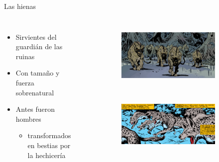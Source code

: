 \begin{frame}{Las hienas}
	\begin{columns}
		\begin{itemize}
			\item Sirvientes del guardián de las ruinas
			\item Con tamaño y fuerza sobrenatural
			\item Antes fueron hombres
			\begin{itemize}
				\item transformados en bestias por la hechicería
			\end{itemize}
		\end{itemize}
		\begin{figure}[htp]
			\centering
			\begin{subfigure}[b]{0.6\textwidth}
				\includegraphics[width=\textwidth]{img/hienas/DH}
			\end{subfigure}
			\\
			\begin{subfigure}[b]{0.6\textwidth}
				\includegraphics[width=\textwidth]{img/hienas/CTB}
			\end{subfigure}
		\end{figure}
	\end{columns}
\end{frame}
\note[itemize]{
	\item
}

